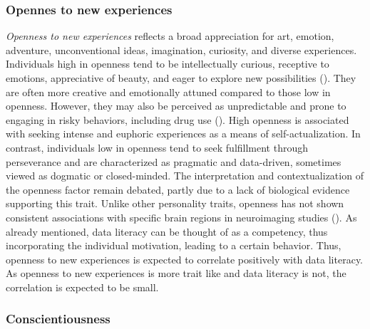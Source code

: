 \documentclass[
  12pt,
  a4paper,
  twoside]{article}
\begin{document}
\subsubsection{Opennes to new experiences}\label{opennes-to-new-experiences}

\emph{Openness to new experiences} reflects a broad appreciation for art, emotion, adventure, unconventional ideas, imagination, curiosity, and diverse experiences. Individuals high in openness tend to be intellectually curious, receptive to emotions, appreciative of beauty, and eager to explore new possibilities (). They are often more creative and emotionally attuned compared to those low in openness. However, they may also be perceived as unpredictable and prone to engaging in risky behaviors, including drug use (). High openness is associated with seeking intense and euphoric experiences as a means of self-actualization. In contrast, individuals low in openness tend to seek fulfillment through perseverance and are characterized as pragmatic and data-driven, sometimes viewed as dogmatic or closed-minded. The interpretation and contextualization of the openness factor remain debated, partly due to a lack of biological evidence supporting this trait. Unlike other personality traits, openness has not shown consistent associations with specific brain regions in neuroimaging studies (). As already mentioned, data literacy can be thought of as a competency, thus incorporating the individual motivation, leading to a certain behavior. Thus, openness to new experiences is expected to correlate positively with data literacy. As openness to new experiences is more trait like and data literacy is not, the correlation is expected to be small.

\subsubsection{Conscientiousness}\label{conscientiousness}
\end{document}
